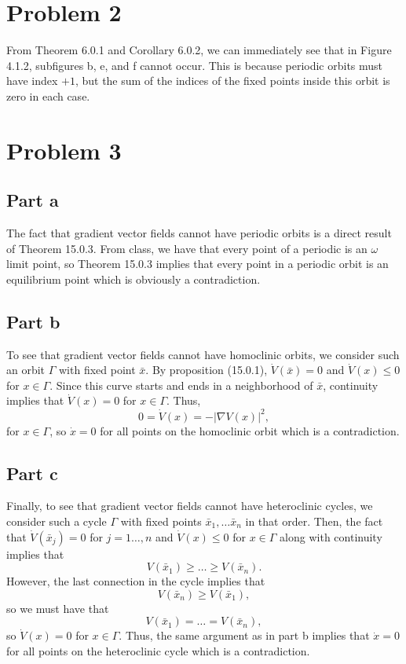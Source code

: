 \documentclass{article}
\begin{document}
\section{Problem 2}
From Theorem 6.0.1 and Corollary 6.0.2, we can immediately see that in Figure 4.1.2, subfigures b, e, and f cannot occur. This is because periodic orbits must have index $+1$, but the sum of the indices of the fixed points inside this orbit is zero in each case.

\section{Problem 3}
\subsection{Part a}
The fact that gradient vector fields cannot have periodic orbits is a direct result of Theorem 15.0.3. From class, we have that every point of a periodic is an $\omega$ limit point, so Theorem 15.0.3 implies that every point in a periodic orbit is an equilibrium point which is obviously a contradiction. 

\subsection{Part b}
To see that gradient vector fields cannot have homoclinic orbits, we consider such an orbit $\Gamma$ with fixed point $\bar x$. By proposition (15.0.1), $\dot V(\bar x)=0$ and $\dot V(x)\leq0$ for $x\in\Gamma$. Since this curve starts and ends in a neighborhood of $\bar x$, continuity implies that $\dot V(x)=0$ for $x\in\Gamma$. Thus, 
\[
0=\dot V(x)=-|\nabla V(x)|^2,
\]
for $x\in\Gamma$, so $\dot x=0$ for all points on the homoclinic orbit which is a contradiction.

\subsection{Part c}
Finally, to see that gradient vector fields cannot have heteroclinic cycles, we consider such a cycle $\Gamma$ with fixed points $\bar x_1,\ldots \bar x_n$ in that order. Then, the fact that $\dot V(\bar x_j)=0$ for $j=1\ldots,n$ and $\dot V(x)\leq0$ for $x\in\Gamma$ along with continuity implies that 
\[
V(\bar x_1)\geq\ldots\geq V(\bar x_n).
\]
However, the last connection in the cycle implies that 
\[
V(\bar x_n)\geq V(\bar x_1),
\]
so we must have that 
\[
V(\bar x_1)=\ldots=V(\bar x_n),
\]
so $\dot V(x)=0$ for $x\in\Gamma$. Thus, the same argument as in part b implies that $\dot x=0$ for all points on the heteroclinic cycle which is a contradiction.
\end{document}

